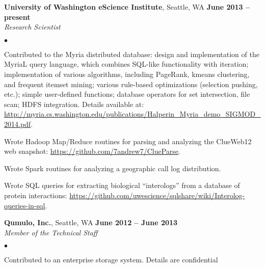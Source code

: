 \documentclass[margin,line]{res}
\newenvironment{list2}{
  \begin{list}{$\bullet$}{%
      \setlength{\itemsep}{0in}
      \setlength{\parsep}{0in} \setlength{\parskip}{0in}
      \setlength{\topsep}{0in} \setlength{\partopsep}{0in} 
      \setlength{\leftmargin}{0.2in}}}{\end{list}}
\begin{document}
\begin{resume}
\textbf{University of Washington eScience Institute}, Seattle, WA \hfill \textbf{June 2013 -- present} \\\vspace{-4mm}
\textsl{Research Scientist} \\
\begin{list2}
\item Contributed to the Myria distributed database: design and implementation of the MyriaL query language, which combines SQL-like functionality with iteration; implementation of various algorithms, including PageRank, kmeans clustering, and frequent itemset mining; various rule-based optimizations (selection pushing, etc.); simple user-defined functions; database operators for set intersection, file scan; HDFS integration.  Details available at:\\
\url{http://myria.cs.washington.edu/publications/Halperin_Myria_demo_SIGMOD_2014.pdf}.
\item Wrote Hadoop Map/Reduce routines for parsing and analyzing the ClueWeb12 web snapshot: 
\url{https://github.com/7andrew7/ClueParse}.
\item Wrote Spark routines for analyzing a geographic call log distribution.
\item Wrote SQL queries for extracting biological ``interologs'' from a database of protein interactions:
\url{https://github.com/uwescience/sqlshare/wiki/Interolog-queries-in-sql}.
\end{list2}

\textbf{Qumulo, Inc.}, Seattle, WA \hfill \textbf{June 2012 -- June 2013} \\\vspace{-4mm}
\textsl{Member of the Technical Staff}  \\
\begin{list2}
  \item Contributed to an enterprise storage system.  Details are confidential
  \end{list2}


\end{resume}
\end{document}
